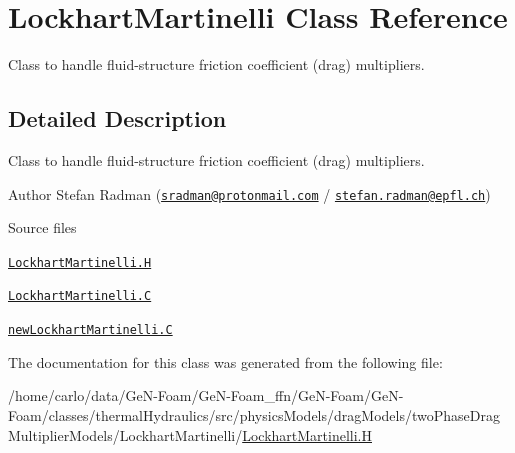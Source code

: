 \hypertarget{classFoam_1_1LockhartMartinelli}{}\section{Lockhart\+Martinelli Class Reference}
\label{classFoam_1_1LockhartMartinelli}


Class to handle fluid-\/structure friction coefficient (drag) multipliers.  




\subsection{Detailed Description}
Class to handle fluid-\/structure friction coefficient (drag) multipliers. 

\label{_Description}%
 Author Stefan Radman (\href{mailto:sradman@protonmail.com}{\tt sradman@protonmail.\+com} / \href{mailto:stefan.radman@epfl.ch}{\tt stefan.\+radman@epfl.\+ch})

\begin{DoxyParagraph}{Source files}

\begin{DoxyItemize}
\item \href{../../../home/carlo/data/GeN-Foam/GeN-Foam_ffn/GeN-Foam/GeN-Foam/classes/thermalHydraulics/src/physicsModels/dragModels/twoPhaseDragMultiplierModels/LockhartMartinelli/LockhartMartinelli.H}{\tt Lockhart\+Martinelli.\+H} 
\item \href{../../../home/carlo/data/GeN-Foam/GeN-Foam_ffn/GeN-Foam/GeN-Foam/classes/thermalHydraulics/src/physicsModels/dragModels/twoPhaseDragMultiplierModels/LockhartMartinelli/LockhartMartinelli.C}{\tt Lockhart\+Martinelli.\+C} 
\item \href{../../../home/carlo/data/GeN-Foam/GeN-Foam_ffn/GeN-Foam/GeN-Foam/classes/thermalHydraulics/src/physicsModels/dragModels/twoPhaseDragMultiplierModels/LockhartMartinelli/newLockhartMartinelli.C}{\tt new\+Lockhart\+Martinelli.\+C} 
\end{DoxyItemize}
\end{DoxyParagraph}


The documentation for this class was generated from the following file\+:\begin{DoxyCompactItemize}
\item 
/home/carlo/data/\+Ge\+N-\/\+Foam/\+Ge\+N-\/\+Foam\+\_\+ffn/\+Ge\+N-\/\+Foam/\+Ge\+N-\/\+Foam/classes/thermal\+Hydraulics/src/physics\+Models/drag\+Models/two\+Phase\+Drag\+Multiplier\+Models/\+Lockhart\+Martinelli/\hyperlink{LockhartMartinelli_8H}{Lockhart\+Martinelli.\+H}\end{DoxyCompactItemize}
